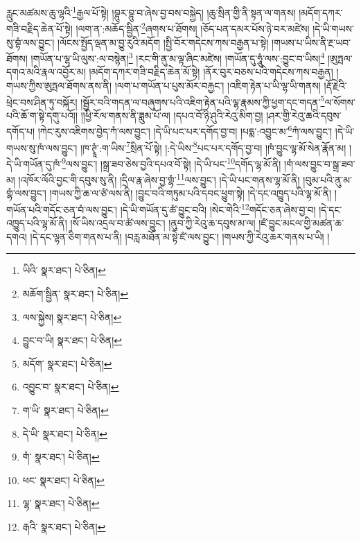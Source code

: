 རླུང་མཚམས་ཆུ་ལྷའི་\footnote{ཡིའི་  སྣར་ཐང་།  པེ་ཅིན། }རྒྱལ་པོ་སྟེ། །བྷུར་བྷུ་བ་ཞེས་བྱ་བས་བསྐྱེད། །ཆུ་སྲིན་གྱི་ནི་སྟན་ལ་གནས། །མདོག་དཀར་གཟི་བརྗིད་ཆེན་པོ་སྟེ། །ལག་ན་:མཆོད་སྦྱིན་\footnote{མཆོག་སྦྱིན་  སྣར་ཐང་།  པེ་ཅིན། }ཞགས་པ་ཐོགས། །ཅོད་པན་དམར་པོས་ཉེ་བར་མཛེས། །དེ་ཡི་གཡས་སུ་བྷཾ་ལས་བྱུང་། །ལོངས་སྤྱོད་ལྡན་མ་བྱུ་རུའི་མདོག །སྤྱི་བོར་གདེངས་ཀས་བརྒྱན་པ་སྟེ། །གཡས་པ་ཡིས་ནི་རྔ་ཡབ་ཐོགས། །གཡོན་པ་ལྷ་ཡི་ལུས་:ལ་བསྙེན།\footnote{ལས་སྐྱེས།  སྣར་ཐང་།  པེ་ཅིན། } །རང་གི་ནུ་མ་ལྟ་ཞིང་མཛེས། །གཡོན་དུ་ཧཱུཾ་ལས་:བྱུང་བ་ཡིས།\footnote{བྱུང་བ་ཡི།  སྣར་ཐང་།  པེ་ཅིན། } །ཨུཏྤལ་དགའ་མའི་རྣལ་འབྱོར་མ། །མདོག་དཀར་གཟི་བརྗིད་ཆེན་མོ་སྟེ། །ནོར་བུར་བཅས་པའི་གདེངས་ཀས་བརྒྱན། །གཡས་ཀྱིས་ཨུཏྤལ་ཐོགས་ནས་ནི། །ལག་པ་གཡོན་པ་པུས་མོར་བརྐྱང་། །འཇིག་རྟེན་པ་ཡི་ལྷ་ཡི་གནས། །རྡོ་རྗེའི་ཕྲེང་བས་ཤིན་ཏུ་བསྐོར། །སྦྱོར་བའི་གདན་ལ་བཞུགས་པའི་འཇིག་རྟེན་པའི་ལྷ་རྣམས་ཀྱི་ཕྱག་དང་གདན་\footnote{མདོག་  སྣར་ཐང་།  པེ་ཅིན། }ལ་སོགས་པའི་ཆོ་ག་སྟེ་དགུ་པའོ།། །།ཕྱི་རོལ་གནས་ནི་ཟླུམ་པོ་ལ། །དཔའ་བོ་ཉི་ཤུའི་རེའུ་མིག་བྱ། །ཤར་གྱི་རེའུ་ཆའི་དབུས་དགོད་པ། །ཀེང་རུས་འཇིགས་བྱེད་ཀཾ་ལས་བྱུང་། །དེ་ཡི་པང་པར་དགོད་བྱ་བ། །པདྨ་:འབྱུང་མ་\footnote{འབྱུང་བ་  སྣར་ཐང་།  པེ་ཅིན། }ཀཾ་ལས་བྱུང་། །དེ་ཡི་གཡས་སུ་ཁཾ་ལས་བྱུང་། །ཁ་ཊྭཱཾ་:ག་ཡིས་\footnote{ག་ཡི་  སྣར་ཐང་།  པེ་ཅིན། }སྲིན་པོ་སྟེ། །:དེ་ཡིས་\footnote{དེ་ཡི་  སྣར་ཐང་།  པེ་ཅིན། }པང་པར་དགོད་བྱ་བ། །ཁཾ་བྱུང་ལྷ་མོ་སེན་རྣོན་མ། །དེ་ཡི་གཡོན་དུ་ཁཾ་\footnote{གཾ་  སྣར་ཐང་།  པེ་ཅིན། }ལས་བྱུང་། །སྒྲ་ཟབ་ཅེས་བྱའི་དཔའ་བོ་སྟེ། །དེ་ཡི་པང་\footnote{ཕང་  སྣར་ཐང་།  པེ་ཅིན། }དགོད་ལྷ་མོ་ནི། །གཾ་ལས་བྱུང་བ་སྒྲ་ཟབ་མ། །འཁོར་ལོའི་བྱང་གི་དབུས་སུ་ནི། །དྲིལ་རྣ་ཞེས་བྱ་གྷཾ་\footnote{ལྷ་  སྣར་ཐང་།  པེ་ཅིན། }ལས་བྱུང་། །དེ་ཡི་པང་གནས་ལྷ་མོ་ནི། །བུམ་པའི་ནུ་མ་གྷཾ་ལས་བྱུང་། །གཡས་ཀྱི་ཆ་ལ་ཙཾ་ལས་ནི། །བྱུང་བའི་གཏུམ་པའི་དབང་ཕྱུག་སྟེ། །དེ་དང་འཁྱུད་པའི་ལྷ་མོ་ནི། །གཡོན་པའི་གདོང་ཅན་བཾ་ལས་བྱུང་། །དེ་ཡི་གཡོན་དུ་ཚཾ་བྱུང་བའི། །སེང་གེའི་\footnote{རྒའི་  སྣར་ཐང་།  པེ་ཅིན། }གདོང་ཅན་ཞེས་བྱ་བ། །དེ་དང་འཁྱུད་པའི་ལྷ་མོ་ནི། །སོ་ཡིས་འདྲལ་བ་ཚཾ་ལས་བྱུང་། །ནུབ་ཀྱི་རེའུ་ཆ་དབུས་མ་ལ། །ཛཾ་བྱུང་མངལ་གྱི་མཚན་ཆ་དགའ། །དེ་དང་ལྷན་ཅིག་གནས་པ་ནི། །བརླ་མཐོན་མ་སྟེ་ཛཾ་ལས་བྱུང་། །གཡས་ཀྱི་རེའུ་ཆར་གནས་པ་ཡི། །
